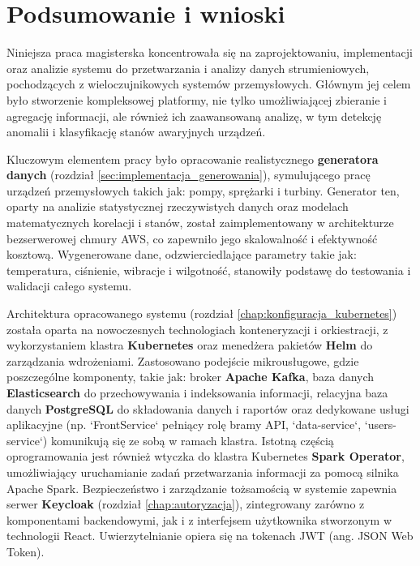 \section{Podsumowanie i wnioski}
\label{sec:podsumowanie_wnioski}

Niniejsza praca magisterska koncentrowała się na zaprojektowaniu, implementacji oraz analizie systemu do przetwarzania i analizy danych strumieniowych, pochodzących z wieloczujnikowych systemów przemysłowych. Głównym jej celem było stworzenie kompleksowej platformy, nie tylko umożliwiającej zbieranie i agregację informacji, ale również ich zaawansowaną analizę, w tym detekcję anomalii i klasyfikację stanów awaryjnych urządzeń.

Kluczowym elementem pracy było opracowanie realistycznego \textbf{generatora danych} (rozdział \ref{sec:implementacja_generowania}), symulującego pracę urządzeń przemysłowych takich jak: pompy, sprężarki i turbiny. Generator ten, oparty na analizie statystycznej rzeczywistych danych oraz modelach matematycznych korelacji i stanów, został zaimplementowany w architekturze bezserwerowej chmury AWS, co zapewniło jego skalowalność i efektywność kosztową. Wygenerowane dane, odzwierciedlające parametry takie jak: temperatura, ciśnienie, wibracje i wilgotność, stanowiły podstawę do testowania i walidacji całego systemu.

Architektura opracowanego systemu (rozdział \ref{chap:konfiguracja_kubernetes}) została oparta na nowoczesnych technologiach konteneryzacji i orkiestracji, z wykorzystaniem klastra \textbf{Kubernetes} oraz menedżera pakietów \textbf{Helm} do zarządzania wdrożeniami. Zastosowano podejście mikrousługowe, gdzie poszczególne komponenty, takie jak: broker \textbf{Apache Kafka}, baza danych \textbf{Elasticsearch} do przechowywania i indeksowania informacji, relacyjna baza danych \textbf{PostgreSQL} do składowania danych i raportów oraz dedykowane usługi aplikacyjne (np. `FrontService` pełniący rolę bramy API, `data-service`, `users-service`) komunikują się ze sobą w ramach klastra. Istotną częścią oprogramowania jest również wtyczka do klastra Kubernetes \textbf{Spark Operator}, umożliwiający uruchamianie zadań przetwarzania informacji za pomocą silnika Apache Spark. Bezpieczeństwo i zarządzanie tożsamością w systemie zapewnia serwer \textbf{Keycloak} (rozdział \ref{chap:autoryzacja}), zintegrowany zarówno z komponentami backendowymi, jak i z interfejsem użytkownika stworzonym w technologii React. Uwierzytelnianie opiera się na tokenach JWT (ang. JSON Web Token).

